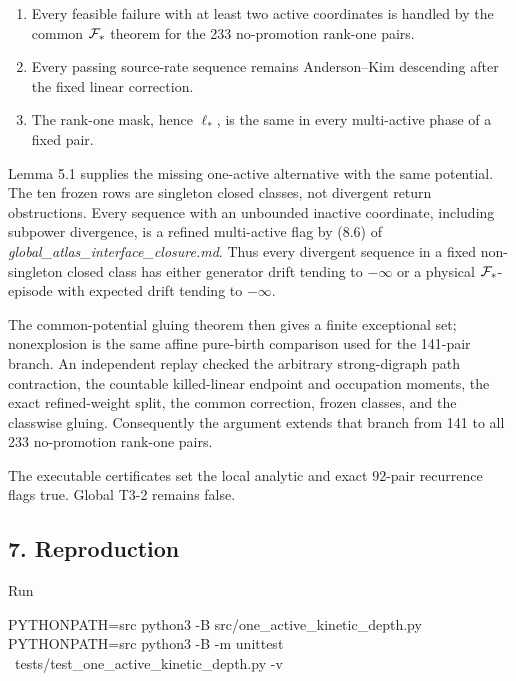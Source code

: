 \begin{enumerate}
\def\labelenumi{\arabic{enumi}.}
\tightlist
\item
  Every feasible failure with at least two active coordinates is handled
  by the common \({\cal F}_*\) theorem for the 233 no-promotion rank-one
  pairs.
\item
  Every passing source-rate sequence remains Anderson--Kim descending
  after the fixed linear correction.
\item
  The rank-one mask, hence \(\ell_*\), is the same in every multi-active
  phase of a fixed pair.
\end{enumerate}

Lemma 5.1 supplies the missing one-active alternative with the same
potential. The ten frozen rows are singleton closed classes, not
divergent return obstructions. Every sequence with an unbounded inactive
coordinate, including subpower divergence, is a refined multi-active
flag by (8.6) of \emph{global\_atlas\_interface\_closure.md}. Thus every
divergent sequence in a fixed non-singleton closed class has either
generator drift tending to \(-\infty\) or a physical
\({\cal F}_*\)-episode with expected drift tending to \(-\infty\).

The common-potential gluing theorem then gives a finite exceptional set;
nonexplosion is the same affine pure-birth comparison used for the
141-pair branch. An independent replay checked the arbitrary
strong-digraph path contraction, the countable killed-linear endpoint
and occupation moments, the exact refined-weight split, the common
correction, frozen classes, and the classwise gluing. Consequently the
argument extends that branch from 141 to all 233 no-promotion rank-one
pairs.

The executable certificates set the local analytic and exact 92-pair
recurrence flags true. Global T3-2 remains false.

\subsection{7. Reproduction}

Run

\begin{CodeBlock}
PYTHONPATH=src python3 -B src/one_active_kinetic_depth.py
PYTHONPATH=src python3 -B -m unittest \
  tests/test_one_active_kinetic_depth.py -v
\end{CodeBlock}
